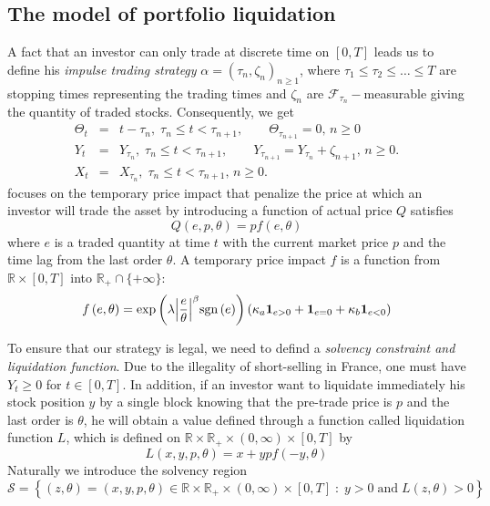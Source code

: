 \documentclass{article}
\begin{document}
\subsection{The model of portfolio liquidation}
A fact that an investor can only trade at discrete time on $[0, T]$ leads us to define his {\it impulse trading strategy} $\alpha = \left(\tau_n, \zeta_n\right)_{n\ge 1}$, where $\tau_1 \le \tau_2 \le \ldots \le T$ are stopping times representing the trading times and $\zeta_n$ are $\mathcal{F}_{\tau_n}-$measurable giving the quantity of traded stocks. Consequently, we get
\begin{eqnarray}
\Theta_t &=& t - \tau_n, \; \tau_n \le t < \tau_{n+1}, \qquad \Theta_{\tau_{n+1}} = 0, \, n\ge 0
\nonumber
\\
Y_t &=& Y_{\tau_n}, \; \tau_n \le t < \tau_{n+1}, \qquad Y_{\tau_{n+1}} = Y_{\tau_{n}} + \zeta_{n+1}, \, n\ge 0.
\nonumber
\\
X_t &=& X_{\tau_n}, \; \tau_n \le t < \tau_{n+1}, \, n\ge 0.
\nonumber
\end{eqnarray}
\cite{KP} focuses on the temporary price impact that penalize the price at which an investor will trade the asset by introducing a function of actual price $Q$ satisfies
\[
Q(e, p, \theta) = p f(e,\theta)
\]
where $e$ is a traded quantity at time $t$ with the current market price $p$ and the time lag from the last order $\theta$. A temporary price impact $f$ is a function from $\mathbb{R}\times [0, T]$ into $\mathbb{R}_+ \cap \{+\infty\}$:
\[
f\left( {e,\theta } \right) = 
\exp \left( 
{\lambda {{\left| {\frac{e}{\theta }} \right|}^\beta }{\mathop{\rm sgn}} \left( e \right)} \right)
\left( {{\kappa_a}{\mathbf{1}_{e > 0}} + {\mathbf{1}_{e = 0}} + {\kappa_b}{\mathbf{1}_{e < 0}}} \right)
\]
\par To ensure that our strategy is legal, we need to defind a {\it solvency constraint and liquidation function}. Due to the illegality of short-selling in France, one must have $Y_t \ge 0$ for $t \in [0, T]$. In addition, if an investor want to liquidate immediately his stock position $y$ by a single block knowing that the pre-trade price is $p$ and the last order is $\theta$, he will obtain a value defined through a function called liquidation function $L$, which is defined on $\mathbb{R}\times\mathbb{R}_+\times (0,\infty)\times [0, T]$ by
\[
L(x, y, p, \theta) = x + ypf(-y,\theta)
\]  
Naturally we introduce the solvency region
\[
\mathcal{S} = \left\{(z, \theta) = (x, y, p, \theta) \in \mathbb{R}\times\mathbb{R}_+\times (0,\infty)\times [0, T] \; : \; y > 0 \;  \textrm{and} \; L(z, \theta) > 0\right\}
\]
\end{document}

